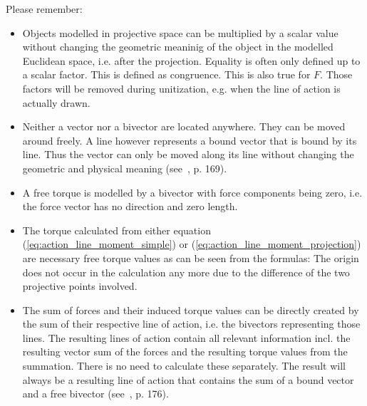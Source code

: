 Please remember:
\begin{itemize}
    \item Objects modelled in projective space can be multiplied by a scalar value without
    changing the geometric meaninig of the object in the modelled Euclidean space, i.e.
    after the projection. Equality is often only defined up to a scalar factor. This is
    defined as congruence. This is also true for $F$. Those factors will be removed during
    unitization, e.g. when the line of action is actually drawn.
    \item Neither a vector nor a bivector are located anywhere. They can be moved around
    freely. A line however represents a bound vector that is bound by its line. Thus the
    vector can only be moved along its line without changing the geometric and physical
    meaning (see~\cite{Browne_Grassmann-Algebra_Vol1:2012}, p. 169).
    \item A free torque is modelled by a bivector with force components being zero, i.e.
    the force vector has no direction and zero length.
    \item The torque calculated from either equation (\ref{eq:action_line_moment_simple})
    or (\ref{eq:action_line_moment_projection}) are necessary free torque values as can be
    seen from the formulas: The origin does not occur in the calculation any more due to
    the difference of the two projective points involved.
    \item The sum of forces and their induced torque values can be directly created by the
    sum of their respective line of action, i.e. the bivectors representing those lines.
    The resulting lines of action contain all relevant information incl. the resulting
    vector sum of the forces and the resulting torque values from the summation. There is
    no need to calculate these separately. The result will always be a resulting line of
    action that contains the sum of a bound vector and a free bivector
    (see~\cite{Browne_Grassmann-Algebra_Vol1:2012}, p. 176).
\end{itemize}


\newpage